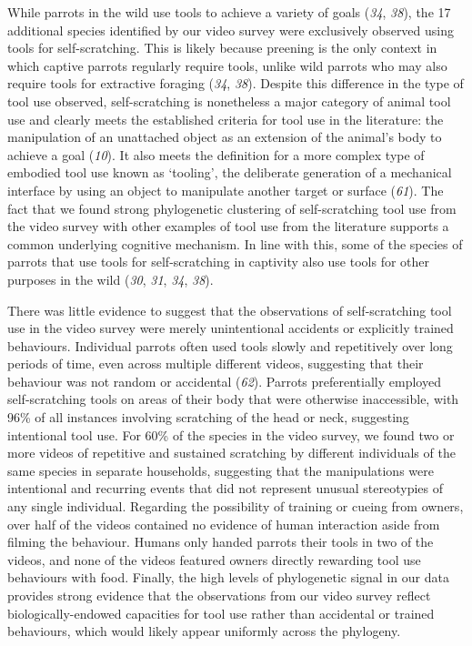 \documentclass[
  man,floatsintext]{apa6}
\begin{document}
While parrots in the wild use tools to achieve a variety of
goals (\emph{34}, \emph{38}), the 17 additional species identified by our
video survey were exclusively observed using tools for self-scratching. This is
likely because preening is the only context in which captive parrots regularly
require tools, unlike wild parrots who may also require tools for extractive
foraging (\emph{34}, \emph{38}). Despite this difference in the type of tool
use observed, self-scratching is nonetheless a major category of animal tool
use and clearly meets the established criteria for tool use in the literature:
the manipulation of an unattached object as an extension of the animal's body to
achieve a goal (\emph{10}). It also meets the definition for a more complex
type of embodied tool use known as `tooling', the deliberate generation of a
mechanical interface by using an object to manipulate another target or
surface (\emph{61}). The fact that we found strong phylogenetic clustering
of self-scratching tool use from the video survey with other examples of tool
use from the literature supports a common underlying cognitive mechanism. In
line with this, some of the species of parrots that use tools for
self-scratching in captivity also use tools for other purposes in the wild
(\emph{30}, \emph{31}, \emph{34}, \emph{38}).

There was little evidence to suggest that the observations of self-scratching
tool use in the video survey were merely unintentional accidents or explicitly
trained behaviours. Individual parrots often used tools slowly and repetitively
over long periods of time, even across multiple different videos, suggesting
that their behaviour was not random or accidental (\emph{62}). Parrots
preferentially employed self-scratching tools on areas of their body that were
otherwise inaccessible, with 96\% of all instances involving scratching of the
head or neck, suggesting intentional tool use. For 60\% of the species in the
video survey, we found two or more videos of repetitive and sustained scratching
by different individuals of the same species in separate households, suggesting
that the manipulations were intentional and recurring events that did not
represent unusual stereotypies of any single individual. Regarding the
possibility of training or cueing from owners, over half of the videos contained
no evidence of human interaction aside from filming the behaviour. Humans only
handed parrots their tools in two of the videos, and none of the videos featured
owners directly rewarding tool use behaviours with food. Finally, the high
levels of phylogenetic signal in our data provides strong evidence that the
observations from our video survey reflect biologically-endowed capacities for
tool use rather than accidental or trained behaviours, which would likely appear
uniformly across the phylogeny.
\end{document}
